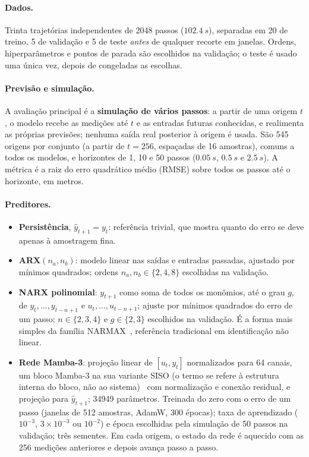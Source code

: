 \documentclass[11pt,a4paper]{article}
\begin{document}
\paragraph{Dados.} Trinta trajetórias independentes de \num{2048} passos ($\SI{102,4}{s}$),
separadas em 20 de treino, 5 de validação e 5 de teste \emph{antes} de qualquer recorte em janelas.
Ordens, hiperparâmetros e pontos de parada são escolhidos na validação; o teste é usado uma única
vez, depois de congeladas as escolhas.

\paragraph{Previsão e simulação.} A avaliação principal é a \textbf{simulação de vários passos}: a
partir de uma origem $t$, o modelo recebe as medições até $t$ e as entradas futuras conhecidas, e
realimenta as próprias previsões; nenhuma saída real posterior à origem é usada. São 545 origens
por conjunto (a partir de $t=256$, espaçadas de 16 amostras), comuns a todos os modelos, e
horizontes de 1, 10 e 50 passos ($\SI{0,05}{s}$, $\SI{0,5}{s}$ e $\SI{2,5}{s}$). A métrica é a
raiz do erro quadrático médio (RMSE) sobre todos os passos até o horizonte, em metros.

\paragraph{Preditores.}
\begin{itemize}\itemsep0pt
  \item \textbf{Persistência}, $\hat y_{t+1}=y_t$: referência trivial, que mostra quanto do erro se
  deve apenas à amostragem fina.
  \item \textbf{ARX$(n_a,n_b)$}: modelo linear nas saídas e entradas passadas, ajustado por mínimos
  quadrados; ordens $n_a,n_b\in\{2,4,8\}$ escolhidas na validação.
  \item \textbf{NARX polinomial}: $y_{t+1}$ como soma de todos os monômios, até o grau $g$, de
  $y_t,\dots,y_{t-n+1}$ e $u_t,\dots,u_{t-n+1}$; ajuste por mínimos quadrados do erro de um passo;
  $n\in\{2,3,4\}$ e $g\in\{2,3\}$ escolhidos na validação. É a forma mais simples da família
  NARMAX~\cite{billings2013}, referência tradicional em identificação não linear.
  \item \textbf{Rede Mamba-3}: projeção linear de $[u_t,y_t]$ normalizados para 64 canais, um bloco
  Mamba-3 na sua variante SISO (o termo se refere à estrutura interna do bloco, não ao
  sistema)~\cite{lahoti2026mamba3} com normalização e conexão residual, e projeção para
  $\hat y_{t+1}$; \num{34949} parâmetros. Treinada do zero com o erro de um passo (janelas de 512
  amostras, AdamW, 300 épocas); taxa de aprendizado ($10^{-3}$, $3\times10^{-3}$ ou $10^{-2}$) e
  época escolhidas pela simulação de 50 passos na validação; três sementes. Em cada origem, o estado
  da rede é aquecido com as 256 medições anteriores e depois avança passo a passo.
\end{itemize}
\end{document}
